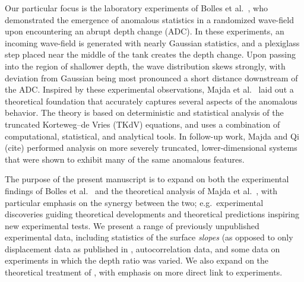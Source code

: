 \documentclass[11pt]{article}
\begin{document}
Our particular focus is the laboratory experiments of Bolles et al.~\cite{bolles2019anomalous}, who demonstrated the emergence of anomalous statistics in a randomized wave-field upon encountering an abrupt depth change (ADC). In these experiments, an incoming wave-field is generated with nearly Gaussian statistics, and a plexiglass step placed near the middle of the tank creates the depth change. Upon passing into the region of shallower depth, the wave distribution skews strongly, with deviation from Gaussian being most pronounced a short distance downstream of the ADC. 
Inspired by these experimental observations, Majda et al.~\cite{majda2019statistical} laid out a theoretical foundation that accurately captures several aspects of the anomalous behavior. The theory is based on deterministic and statistical analysis of the truncated Korteweg–de Vries (TKdV) equations, and uses a combination of computational, statistical, and analytical tools. In follow-up work, Majda and Qi (cite) performed analysis on more severely truncated, lower-dimensional systems that were shown to exhibit many of the same anomalous features.

The purpose of the present manuscript is to expand on both the experimental findings of Bolles et al.~\cite{bolles2019anomalous} and the theoretical analysis of Majda et al.~\cite{majda2019statistical}, with particular emphasis on the synergy between the two; e.g.~experimental discoveries guiding theoretical developments and theoretical predictions inspiring new experimental tests. We present a range of previously unpublished experimental data, including statistics of the surface {\em slopes} (as opposed to only displacement data as published in \cite{bolles2019anomalous}, autocorrelation data, and some data on experiments in which the depth ratio was varied. We also expand on the theoretical treatment of \cite{majda2019statistical}, with emphasis on more direct link to experiments.






\end{document}
